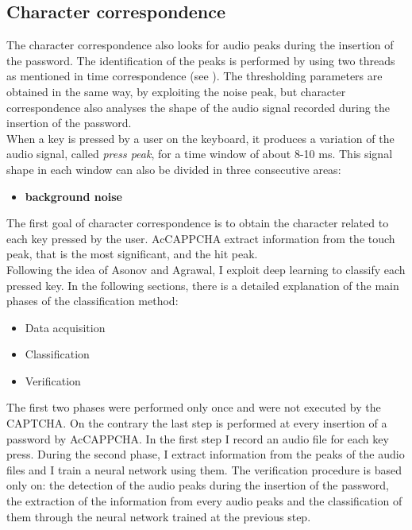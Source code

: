 \subsection{Character correspondence}\label{AcCAPPCHA:char_correspondence}
The character correspondence also looks for audio peaks during the insertion of the password. The identification of the peaks is performed by using two threads as mentioned in time correspondence (see ). The thresholding parameters are obtained in the same way, by exploiting the noise peak, but character correspondence also analyses the shape of the audio signal recorded during the insertion of the password.\\
When a key is pressed by a user on the keyboard, it produces a variation of the audio signal, called \textit{press peak}, for a time window of about 8-10 ms\cite{keyboard_acoustic}. This signal shape in each window can also be divided in three consecutive areas:
\begin{itemize}
\item{\textbf{background noise}}
\end{itemize}
The first goal of character correspondence is to obtain the character related to each key pressed by the user. AcCAPPCHA extract information from the touch peak, that is the most significant, and the hit peak.\\
Following the idea of Asonov and Agrawal, I exploit deep learning to classify each pressed key. In the following sections, there is a detailed explanation of the main phases of the classification method:
\begin{itemize}
\item{Data acquisition}
\item{Classification}
\item{Verification}
\end{itemize}
The first two phases were performed only once and were not executed by the CAPTCHA. On the contrary the last step is performed at every insertion of a password by AcCAPPCHA.
In the first step I record an audio file for each key press. During the second phase, I extract information from the peaks of the audio files and I train a neural network using them. The verification procedure is based only on: the detection of the audio peaks during the insertion of the password, the extraction of the information from every audio peaks and the classification of them through the neural network trained at the previous step.


